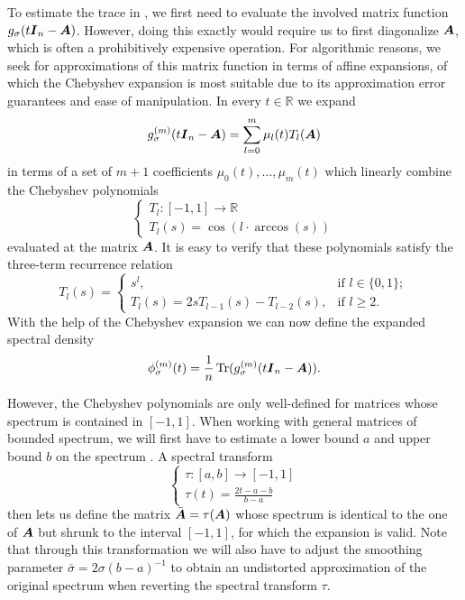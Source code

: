 \documentclass[12pt]{article}
\begin{document}
To estimate the trace in , we first need to evaluate the involved matrix function $g_{\sigma}(t\boldsymbol{I}_n - \boldsymbol{A})$. However, doing this exactly would require us to first diagonalize $\boldsymbol{A}$, which is often a prohibitively expensive operation. For algorithmic reasons, we seek for approximations of this matrix function in terms of affine expansions, of which the Chebyshev expansion is most suitable due to its approximation error guarantees and ease of manipulation. In every $t \in \mathbb{R}$ we expand 
\begin{equation}
    g_{\sigma}^{(m)}(t\boldsymbol{I}_n - \boldsymbol{A}) = \sum_{l=0}^{m} \mu_l(t) T_l(\boldsymbol{A})
    \label{equ:matrix-expansion}
\end{equation}
in terms of a set of $m+1$ coefficients $\mu_0(t), \dots, \mu_m(t)$ which linearly combine the Chebyshev polynomials
\begin{equation}
    \begin{cases}
        T_l : [-1, 1] \to \mathbb{R} \\
        T_l(s) = \cos(l \cdot \arccos(s))
    \end{cases}
    \label{equ:chebyshev-polynomial}
\end{equation}
evaluated at the matrix $\boldsymbol{A}$. It is easy to verify that these polynomials satisfy the three-term recurrence relation
\begin{equation}
    T_l(s) =
    \begin{cases}
        s^l, & \text{if $l \in \{0, 1\}$}; \\
        T_l(s) = 2 s T_{l-1}(s) - T_{l-2}(s), & \text{if $l \geq 2$.}
    \end{cases}
    \label{equ:chebyshev-recurrence}
\end{equation}
With the help of the Chebyshev expansion  we can now define the expanded spectral density
\begin{equation}
    \phi_{\sigma}^{(m)}(t) =  \frac{1}{n} \operatorname{Tr}(g_{\sigma}^{(m)}(t \boldsymbol{I}_n - \boldsymbol{A})).
    \label{equ:expanded-spectral-density}
\end{equation}

However, the Chebyshev polynomials are only well-defined for matrices whose spectrum is contained in $[-1, 1]$. When working with general matrices of bounded spectrum, we will first have to estimate a lower bound $a$ and upper bound $b$ on the spectrum \cite{zhou-2011-bounding-spectrum}. A spectral transform
\begin{equation}
    \begin{cases}
        \tau : [a, b] \to [-1, 1]\\
        \tau(t) = \frac{2t - a - b}{b - a}
    \end{cases}
\end{equation}
then lets us define the matrix $\bar{\boldsymbol{A}} = \tau(\boldsymbol{A})$ whose spectrum is identical to the one of $\boldsymbol{A}$ but shrunk to the interval $[-1, 1]$, for which the expansion  is valid. Note that through this transformation we will also have to adjust the smoothing parameter $\bar{\sigma} = 2 \sigma (b - a)^{-1}$ to obtain an undistorted approximation of the original spectrum when reverting the spectral transform $\tau$.
\end{document}
